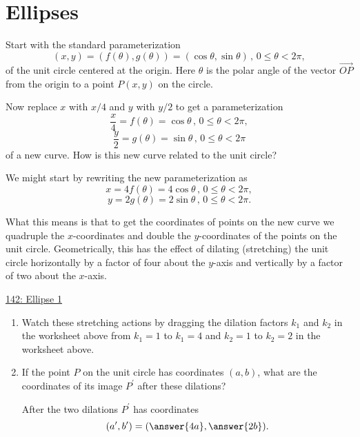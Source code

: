 \documentclass{ximera}
\begin{document}
\section{Ellipses}
\begin{example} \label{Ex:DFDrefdfobbzx}
Start with the standard parameterization 
\[
    (x,y) = (f(\theta) , g(\theta)) =   ( \cos \theta , \sin \theta ) \, , \, 0\leq\theta < 2\pi ,
\]
of the unit circle centered at the origin. Here $\theta$ is the polar angle of the vector $\overrightarrow{OP}$ from the origin to a point $P(x,y)$ on the circle.

Now replace $x$ with $x/4$ and $y$ with $y/2$ to get a parameterization
\[
  \frac{x}{4} = f(\theta) = \cos\theta \, , \, 0\leq\theta < 2\pi ,
\]
\[
  \frac{y}{2} = g(\theta) = \sin \theta \, , \, 0\leq\theta < 2\pi 
\]
of a new curve. How is this new curve related to the unit circle?

We might start by rewriting the new parameterization as
\[
      x = 4 f(\theta) = 4\cos\theta \, , \, 0\leq\theta < 2\pi ,
\]
\[ 
   y = 2 g(\theta) = 2\sin \theta \, , \, 0\leq\theta < 2\pi .
\]

What this means is that to get the coordinates of points on the new curve we quadruple the $x$-coordinates and double the $y$-coordinates of the points on the unit circle. Geometrically, this has the effect of dilating (stretching) the unit circle horizontally by a factor of four about the $y$-axis and vertically by a factor of two about the $x$-axis. 


\begin{onlineOnly}
    \begin{center}
\end{center}
\end{onlineOnly}

\href{https://www.desmos.com/calculator/3ibj708prx}{142: Ellipse 1}

\begin{enumerate}
\item Watch these stretching actions by dragging the dilation factors $k_1$ and $k_2$ in the worksheet above from $k_1=1$ to $k_1=4$ and $k_2=1$ to $k_2 = 2$ in the worksheet above.

\item If the point $P$ on the unit circle has coordinates $(a,b)$, what are the coordinates of its image $P^\prime$ after these dilations?

After the two dilations $P^\prime$ has coordinates
\[
    (a^\prime, b^\prime) = (  \answer{4a} , \answer{2b} ) .
\]


\end{enumerate}
\end{example}
\end{document}
